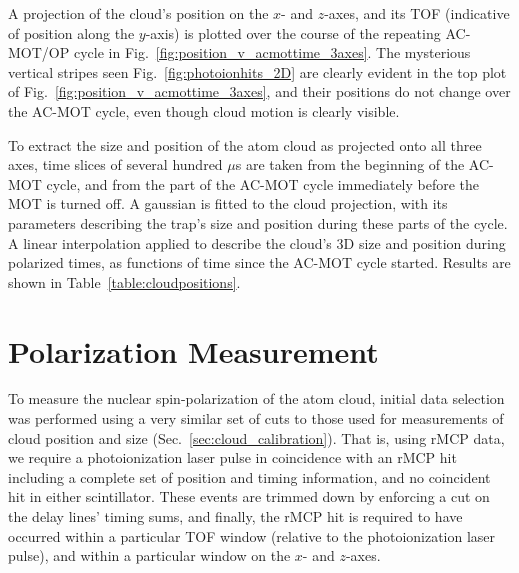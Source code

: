 A projection of the cloud's position on the $x$- and $z$-axes, and its \ac{TOF} (indicative of position along the $y$-axis) is plotted over the course of the repeating \ac{AC-MOT}/\ac{OP} cycle in Fig.~\ref{fig:position_v_acmottime_3axes}. The mysterious vertical stripes seen Fig.~\ref{fig:photoionhits_2D} are clearly evident in the top plot of Fig.~\ref{fig:position_v_acmottime_3axes}, and their positions do not change over the AC-MOT cycle, even though cloud motion is clearly visible.  
 
To extract the size and position of the atom cloud as projected onto all three axes, time slices of several hundred $\mu$s are taken from the beginning of the AC-MOT cycle, and from the part of the AC-MOT cycle immediately before the MOT is turned off.  A gaussian is fitted to the cloud projection, with its parameters describing the trap's size and position during these parts of the cycle.  A linear interpolation applied to describe the cloud's 3D size and position during polarized times, as functions of time since the AC-MOT cycle started.  Results are shown in Table~\ref{table:cloudpositions}.


\FloatBarrier %






\section{Polarization Measurement}
\label{sec:pol_meas}
To measure the nuclear spin-polarization of the atom cloud, initial data selection was performed using a very similar set of cuts to those used for measurements of cloud position and size (Sec.~\ref{sec:cloud_calibration}).  That is, using \ac{rMCP} data, we require a photoionization laser pulse in coincidence with an rMCP hit including a complete set of position and timing information, and no coincident hit in either scintillator.  These events are trimmed down by enforcing a cut on the delay lines' timing sums, and finally, the rMCP hit is required to have occurred within a particular \ac{TOF} window (relative to the photoionization laser pulse), and within a particular window on the $x$- and $z$-axes.

